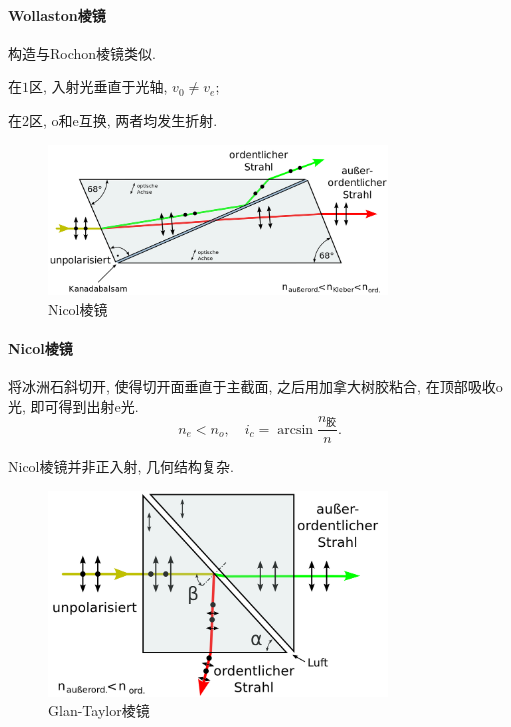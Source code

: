 \documentclass{ctexart}
\begin{document}
\paragraph{Wollaston棱镜} %
\label{par:wollaston棱镜}

构造与Rochon棱镜类似.
\begin{cenum}
    \item 在$1$区, 入射光垂直于光轴, $v_0\neq v_e$;
    \item 在$2$区, o和e互换, 两者均发生折射.
\end{cenum}


\begin{figure}[ht]
    \centering
    \includegraphics[width=9cm]{src/Nicol.png}
    \caption{Nicol棱镜}
\end{figure}

\paragraph{Nicol棱镜} %
\label{par:nicol棱镜}

将冰洲石斜切开, 使得切开面垂直于主截面, 之后用加拿大树胶粘合, 在顶部吸收o光, 即可得到出射e光.
\[ n_e < n_o,\quad i_c = \arcsin \frac{n_{\text{胶}}}{n}. \]

\begin{remark}
    Nicol棱镜并非正入射, 几何结构复杂.
\end{remark}


\begin{figure}[ht]
    \centering
    \includegraphics[width=9cm]{src/GlanTaylor.png}
    \caption{Glan-Taylor棱镜}
\end{figure}
\end{document}
